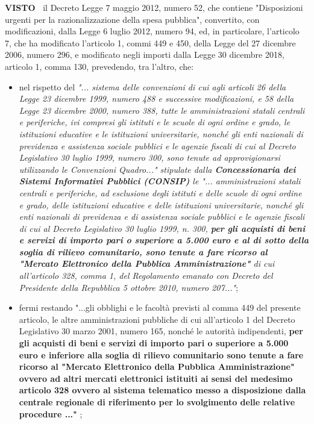 \textbf{VISTO~}	il Decreto Legge 7 maggio 2012, numero 52, che contiene
"Disposizioni urgenti per la razionalizzazione della spesa pubblica",
convertito, con modificazioni, dalla Legge 6 luglio 2012, numero 94, ed,
in particolare, l’articolo 7, che ha modificato l’articolo 1, commi
449 e 450, della Legge del 27 dicembre 2006, numero 296, e modificato
negli importi dalla Legge 30 dicembre 2018, articolo 1, comma 130,
prevedendo, tra l’altro, che:

\begin{itemize}
    
\item nel rispetto del \textit{"... sistema delle convenzioni di cui
agli articoli 26 della Legge 23 dicembre 1999, numero 488 e successive
modificazioni, e 58 della Legge 23 dicembre 2000, numero 388, tutte
le amministrazioni statali centrali e periferiche, ivi compresi gli
istituti e le scuole di ogni ordine e grado, le istituzioni educative e
le istituzioni universitarie, nonché gli enti nazionali di previdenza
e assistenza sociale pubblici e le agenzie fiscali di cui al Decreto
Legislativo 30 luglio 1999, numero 300, sono tenute ad approvigionarsi
utilizzando le Convenzioni Quadro..." stipulate dalla \textbf{Concessionaria
dei Sistemi Informativi Pubblici (CONSIP)} le "... amministrazioni
statali centrali e periferiche, ad esclusione degli istituti e delle
scuole di ogni ordine e grado, delle istituzioni educative e delle
istituzioni universitarie, nonché gli enti nazionali di previdenza e
di assistenza sociale pubblici e le agenzie fiscali di cui al Decreto
Legislativo 30 luglio 1999, n. 300, \textbf{per gli acquisti di beni e servizi
di importo pari o superiore a 5.000 euro e al di sotto della soglia di
rilievo comunitario, sono tenute a fare ricorso al "Mercato Elettronico
della Pubblica Amministrazione"} di cui all’articolo 328, comma 1,
del Regolamento emanato con Decreto del Presidente della Repubblica 5
ottobre 2010, numero 207..."};

\item fermi restando "...gli obblighi e le facoltà previsti al
comma 449 del presente articolo, le altre amministrazioni pubbliche di
cui all’articolo 1 del Decreto Legislativo 30 marzo 2001, numero 165,
nonché le autorità indipendenti, \textbf{per gli acquisti di beni e servizi di
importo pari o superiore a 5.000 euro e inferiore alla soglia di rilievo
comunitario sono tenute a fare ricorso al "Mercato Elettronico della
Pubblica Amministrazione" ovvero ad altri mercati elettronici istituiti
ai sensi del medesimo articolo 328 ovvero al sistema telematico messo a
disposizione dalla centrale regionale di riferimento per lo svolgimento
delle relative procedure ..."} ;

\end{itemize}

